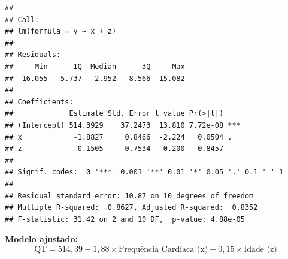 \documentclass[
]{book}
\begin{document}
\begin{verbatim}
## 
## Call:
## lm(formula = y ~ x + z)
## 
## Residuals:
##     Min      1Q  Median      3Q     Max 
## -16.055  -5.737  -2.952   8.566  15.082 
## 
## Coefficients:
##             Estimate Std. Error t value Pr(>|t|)    
## (Intercept) 514.3929    37.2473  13.810 7.72e-08 ***
## x            -1.8827     0.8466  -2.224   0.0504 .  
## z            -0.1505     0.7534  -0.200   0.8457    
## ---
## Signif. codes:  0 '***' 0.001 '**' 0.01 '*' 0.05 '.' 0.1 ' ' 1
## 
## Residual standard error: 10.87 on 10 degrees of freedom
## Multiple R-squared:  0.8627, Adjusted R-squared:  0.8352 
## F-statistic: 31.42 on 2 and 10 DF,  p-value: 4.88e-05
\end{verbatim}

\textbf{Modelo ajustado:}\\
\[
\text{QT} = 514,39 - 1,88 \times \text{Frequência Cardíaca (x)} - 0,15 \times \text{Idade (z)}
\]
\end{document}
